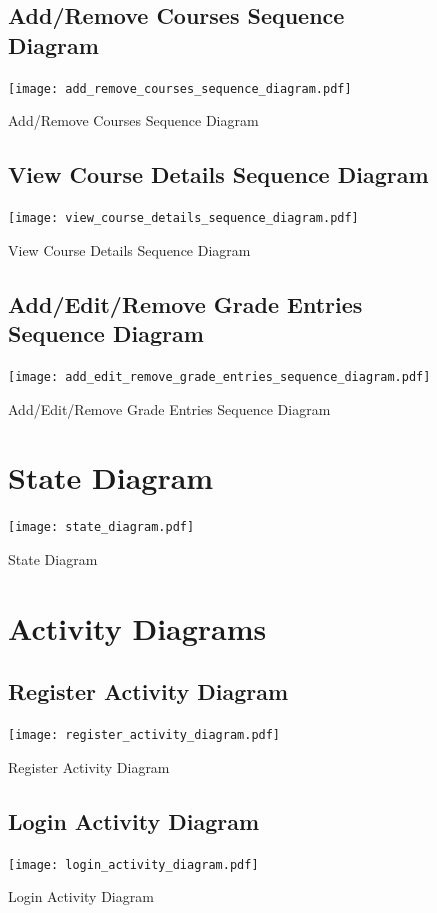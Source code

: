 \documentclass[12pt]{article}
\begin{document}
\begin{figure}[p!]
  \subsection{Add/Remove Courses Sequence Diagram}
  \centering
  \texttt{[image: add\_remove\_courses\_sequence\_diagram.pdf]}
  \caption{Add/Remove Courses Sequence Diagram}
\end{figure}

\begin{figure}[p!]
  \subsection{View Course Details Sequence Diagram}
  \centering
  \texttt{[image: view\_course\_details\_sequence\_diagram.pdf]}
  \caption{View Course Details Sequence Diagram}
\end{figure}

\begin{figure}[p!]
  \subsection{Add/Edit/Remove Grade Entries Sequence Diagram}
  \centering
  \texttt{[image: add\_edit\_remove\_grade\_entries\_sequence\_diagram.pdf]}
  \caption{Add/Edit/Remove Grade Entries Sequence Diagram}
\end{figure}

\begin{figure}[p!]
  \section{State Diagram}
  \centering
  \texttt{[image: state\_diagram.pdf]}
  \caption{State Diagram}
\end{figure}

\begin{figure}[p!]
  \section{Activity Diagrams}
  \subsection{Register Activity Diagram}
  \centering
  \texttt{[image: register\_activity\_diagram.pdf]}
  \caption{Register Activity Diagram}
\end{figure}

\begin{figure}[p!]
  \subsection{Login Activity Diagram}
  \centering
  \texttt{[image: login\_activity\_diagram.pdf]}
  \caption{Login Activity Diagram}
\end{figure}
\end{document}
